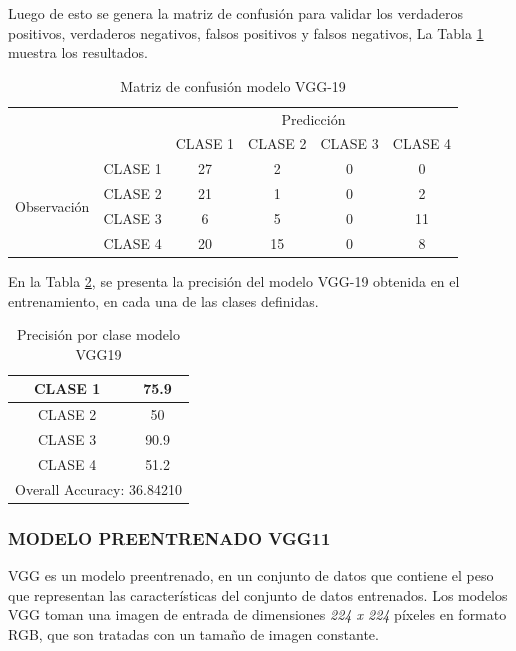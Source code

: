 \newpage
Luego de esto se genera la matriz de confusión para validar los verdaderos positivos, verdaderos negativos, falsos positivos y falsos negativos, La Tabla \ref{fig:MC_VGG19} muestra los resultados.


\begin{table}[htbp]
	\centering
	\begin{tabular}{|c|l|c|c|c|c|}
		\hline
		\multicolumn{2}{|c|}{\multirow{2}[4]{*}{}} & \multicolumn{4}{c|}{Predicción} \bigstrut\\
		\cline{3-6}    \multicolumn{2}{|c|}{} & CLASE 1 & CLASE 2 & CLASE 3 & CLASE 4 \bigstrut\\
		\hline
		\multirow{4}[8]{*}{\begin{sideways}Observación\end{sideways}} & CLASE 1 & 27     & 2     & 0    & 0 \bigstrut\\
		\cline{2-6}     & CLASE 2 & 21     & 1     & 0    & 2 \bigstrut\\
		\cline{2-6}      & CLASE 3 & 6     & 5     & 0    & 11 \bigstrut\\
		\cline{2-6}     & CLASE 4 & 20     & 15     & 0    & 8 \bigstrut\\
		\hline
	\end{tabular}%
	\caption{Matriz de confusión modelo VGG-19}
	\label{fig:MC_VGG19}
\end{table}%

En la Tabla \ref{fig:ACU_VGG19}, se presenta la precisión del modelo VGG-19 obtenida en el entrenamiento, en cada una de las clases definidas.

\begin{table}[htbp]
	\centering
	\begin{tabular}{|c|c|}
		\hline
		CLASE 1 & 75.9 \bigstrut\\
		\hline
		CLASE 2 & 50 \bigstrut\\
		\hline
		CLASE 3 & 90.9 \bigstrut\\
		\hline
		CLASE 4 & 51.2 \bigstrut\\
		\hline
		\multicolumn{2}{|c|}{Overall Accuracy: 36.84210} \bigstrut\\
		\hline
	\end{tabular}%
	\caption{Precisión por clase modelo VGG19}
	\label{fig:ACU_VGG19}
\end{table}%


\newpage
\subsubsection{\MakeUppercase{Modelo preentrenado VGG11}}
VGG es un modelo preentrenado, en un conjunto de datos que contiene el peso que representan las características del conjunto de datos entrenados. Los modelos VGG toman una imagen de entrada de dimensiones \textit{224 x 224} píxeles en formato RGB, que son tratadas con un tamaño de imagen constante.\\


